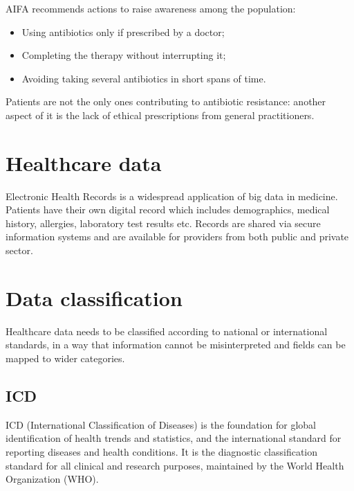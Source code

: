 AIFA recommends actions to raise awareness among the population\cite{aifaar}:
\begin{itemize}
	\item Using antibiotics only if prescribed by a doctor;
	\item Completing the therapy without interrupting it;
	\item Avoiding taking several antibiotics in short spans of time.
\end{itemize}

Patients are not the only ones contributing to antibiotic resistance: another aspect of it is the lack of ethical prescriptions from general practitioners. 




\section{Healthcare data}
Electronic Health Records is a widespread application of big data in medicine. Patients have their own digital record which includes demographics, medical history, allergies, laboratory test results etc. Records are shared via secure information systems and are available for providers from both public and private sector\cite{datapine}.


\section{Data classification}
Healthcare data needs to be classified according to national or international standards, in a way that information cannot be misinterpreted and fields can be mapped to wider categories.

\subsection{ICD}
ICD (International Classification of Diseases) is the foundation for global identification of health trends and statistics, and the international standard for reporting diseases and health conditions. It is the diagnostic classification standard for all clinical and research purposes\cite{who}, maintained by the World Health Organization (WHO).

